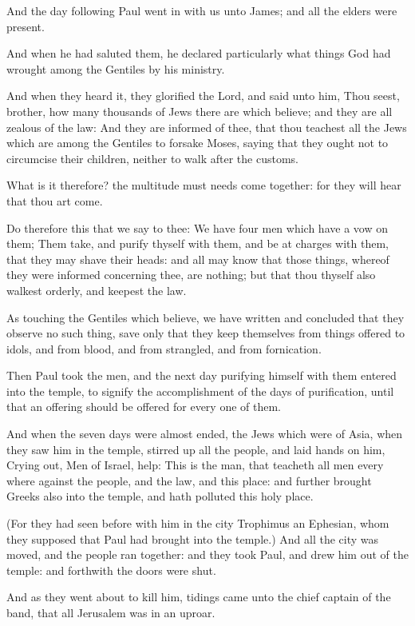 \Verse And the day following Paul went in with us unto James; and all the elders were present.

\Verse And when he had saluted them, he declared particularly what things God had wrought among the Gentiles by his ministry.

\Verse And when they heard it, they glorified the Lord, and said unto him, Thou seest, brother, how many thousands of Jews there are which believe; and they are all zealous of the law: \Verse And they are informed of thee, that thou teachest all the Jews which are among the Gentiles to forsake Moses, saying that they ought not to circumcise their children, neither to walk after the customs.

\Verse What is it therefore? the multitude must needs come together: for they will hear that thou art come.

\Verse Do therefore this that we say to thee: We have four men which have a vow on them; \Verse Them take, and purify thyself with them, and be at charges with them, that they may shave their heads: and all may know that those things, whereof they were informed concerning thee, are nothing; but that thou thyself also walkest orderly, and keepest the law.

\Verse As touching the Gentiles which believe, we have written and concluded that they observe no such thing, save only that they keep themselves from things offered to idols, and from blood, and from strangled, and from fornication.

\Verse Then Paul took the men, and the next day purifying himself with them entered into the temple, to signify the accomplishment of the days of purification, until that an offering should be offered for every one of them.

\Verse And when the seven days were almost ended, the Jews which were of Asia, when they saw him in the temple, stirred up all the people, and laid hands on him, \Verse Crying out, Men of Israel, help: This is the man, that teacheth all men every where against the people, and the law, and this place: and further brought Greeks also into the temple, and hath polluted this holy place.

\Verse (For they had seen before with him in the city Trophimus an Ephesian, whom they supposed that Paul had brought into the temple.)  \Verse And all the city was moved, and the people ran together: and they took Paul, and drew him out of the temple: and forthwith the doors were shut.

\Verse And as they went about to kill him, tidings came unto the chief captain of the band, that all Jerusalem was in an uproar.

